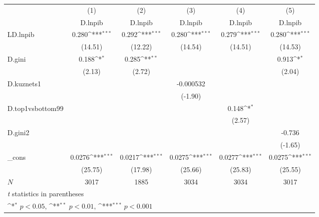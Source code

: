 {
\def\sym#1{\ifmmode^{#1}\else\(^{#1}\)\fi}
\begin{tabular}{l*{5}{c}}
\hline\hline
            &\multicolumn{1}{c}{(1)}&\multicolumn{1}{c}{(2)}&\multicolumn{1}{c}{(3)}&\multicolumn{1}{c}{(4)}&\multicolumn{1}{c}{(5)}\\
            &\multicolumn{1}{c}{D.lnpib}&\multicolumn{1}{c}{D.lnpib}&\multicolumn{1}{c}{D.lnpib}&\multicolumn{1}{c}{D.lnpib}&\multicolumn{1}{c}{D.lnpib}\\
\hline
LD.lnpib    &       0.280\sym{***}&       0.292\sym{***}&       0.280\sym{***}&       0.279\sym{***}&       0.280\sym{***}\\
            &     (14.51)         &     (12.22)         &     (14.54)         &     (14.51)         &     (14.53)         \\
[1em]
D.gini      &       0.188\sym{*}  &       0.285\sym{**} &                     &                     &       0.913\sym{*}  \\
            &      (2.13)         &      (2.72)         &                     &                     &      (2.04)         \\
[1em]
D.kuznets1  &                     &                     &   -0.000532         &                     &                     \\
            &                     &                     &     (-1.90)         &                     &                     \\
[1em]
D.top1vsbottom99&                     &                     &                     &       0.148\sym{*}  &                     \\
            &                     &                     &                     &      (2.57)         &                     \\
[1em]
D.gini2     &                     &                     &                     &                     &      -0.736         \\
            &                     &                     &                     &                     &     (-1.65)         \\
[1em]
\_cons      &      0.0276\sym{***}&      0.0217\sym{***}&      0.0275\sym{***}&      0.0277\sym{***}&      0.0275\sym{***}\\
            &     (25.75)         &     (17.98)         &     (25.66)         &     (25.83)         &     (25.55)         \\
\hline
\(N\)       &        3017         &        1885         &        3034         &        3034         &        3017         \\
\hline\hline
\multicolumn{6}{l}{\footnotesize \textit{t} statistics in parentheses}\\
\multicolumn{6}{l}{\footnotesize \sym{*} \(p<0.05\), \sym{**} \(p<0.01\), \sym{***} \(p<0.001\)}\\
\end{tabular}
}
